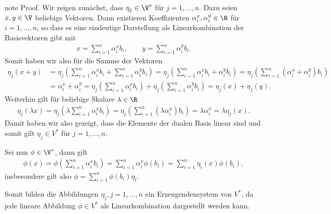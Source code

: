 \documentclass[letterpaper,10pt,german]{jupyterBook}
\begin{document}
\begin{sphinxadmonition}{note}
\sphinxAtStartPar
Proof. Wir zeigen zunächst, dass \(\eta_j\in\V^\ast\) für \(j=1,\ldots,n\).
Dazu seien \(x,y\in\V\) beliebige Vektoren.
Dann existieren Koeffizienten \(\alpha_i^x,\alpha_i^y \in \R\) für \(i=1,\ldots,n\), so dass es eine eindeutige Darstellung als Linearkombination der Basisvektoren gibt mit
\begin{equation*}
\begin{split}x = \sum_{i=1}^n \alpha_i^x b_i, \qquad y = \sum_{i=1}^n \alpha_i^y b_i.\end{split}
\end{equation*}
\sphinxAtStartPar
Somit haben wir also für die Summe der Vektoren
\begin{equation*}
\begin{split}\eta_j(x+y) &= 
\eta_j\left(\sum_{i=1}^n \alpha_i^x b_i + \sum_{i=1}^n \alpha_i^y b_i\right) = 
\eta_j\left(\sum_{i=1}^n \alpha_i^x b_i + \alpha_i^y b_i\right) = 
\eta_j\left(\sum_{i=1}^n (\alpha_i^x + \alpha_i^y) b_i\right) 
\\&= \alpha_i^x + \alpha_i^y = 
\eta_j\left(\sum_{i=1}^n \alpha_i^x b_i\right)  + \eta_j\left(\sum_{i=1}^n \alpha_i^y b_i\right) = 
\eta_j(x) + \eta_j(y).\end{split}
\end{equation*}
\sphinxAtStartPar
Weiterhin gilt für beliebige Skalare \(\lambda\in\R\)
\begin{equation*}
\begin{split}\eta_j(\lambda x) = \eta_j\left(\lambda \sum_{i=1}^n \alpha_i^x b_i\right) = 
\eta_j\left(\sum_{i=1}^n (\lambda \alpha_i^x) b_i\right) =
\lambda \alpha_i^x =
\lambda \eta_j(x).\end{split}
\end{equation*}
\sphinxAtStartPar
Damit haben wir also gezeigt, dass die Elemente der dualen Basis linear sind und somit gilt \(\eta_j \in V^\ast\) für \(j=1,\ldots,n\).

\sphinxAtStartPar
Sei nun \(\phi\in \V^\ast\), dann gilt
\begin{equation*}
\begin{split}\phi(x) = \phi\left(\sum_{i=1}^n \alpha_i^x b_i\right) = \sum_{i=1}^n \alpha_i^x \phi(b_i) = 
\sum_{i=1}^n \eta_i(x) \phi(b_i),\end{split}
\end{equation*}
\sphinxAtStartPar
insbesondere gilt also \(\phi = \sum_{i=1}^n \phi(b_i) \eta_i\).

\sphinxAtStartPar
Somit bilden die Abbildungen \(\eta_j, j=1,\ldots, n\) ein Erzeugendensystem von \(V^\ast\), da jede lineare Abbildung \(\phi \in V^\ast\) als Linearkombination dargestellt werden kann.


\end{sphinxadmonition}
\end{document}
